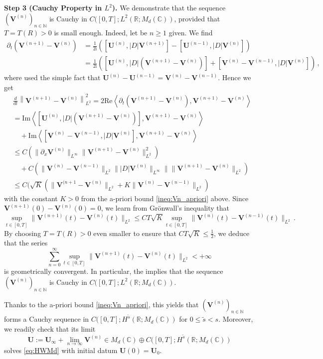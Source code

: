 \documentclass[11pt,reqno]{amsart}
\theoremstyle{definition}
\theoremstyle{remark}
\theoremstyle{remark}
\numberwithin{equation}{section}
\newcommand{\C}{\mathbb{C}}
\newcommand{\N}{\mathbb{N}}
\newcommand{\R}{\mathbb{R}}
\newcommand{\pt}{\partial}
\newcommand{\ii}{\mathrm{i}}
\newcommand{\Vb}{\mathbf{V}}
\newcommand{\Ub}{\mathbf{U}}
\begin{document}
\begin{appendix}
\medskip
\textbf{Step 3 (Cauchy Property in $L^2$).} We demonstrate that the sequence $(\Vb^{(n)})_{n \in \N}$ is Cauchy in $C([0,T]; L^2(\R; M_d(\C))$, provided that $T=T(R) > 0$ is small enough. Indeed, let be $n \geq 1$ given. We find
\begin{align*}
\pt_t \left ( \Vb^{(n+1)} - \Vb^{(n)} \right ) & = \frac{1}{2 \ii} \left ( [\Ub^{(n)}, |D| \Vb^{(n+1)}] - [\Ub^{(n-1)}, |D| \Vb^{(n)}] \right ) \\
& = \frac{1}{2 \ii} \left ( [\Ub^{(n)}, |D| (\Vb^{(n+1)}- \Vb^{(n)})] + [ \Vb^{(n)}-\Vb^{(n-1)}, |D| \Vb^{(n)}] \right ) \, ,
\end{align*}
where used the simple fact that $\Ub^{(n)}-\Ub^{(n-1)} = \Vb^{(n)}-\Vb^{(n-1)}$. Hence we get
\begin{align*}
& \frac{d}{dt} \left \| \Vb^{(n+1)}- \Vb^{(n)} \right \|_{L^2}^2  = 2 \mathrm{Re} \left \langle \pt_t(\Vb^{(n+1)}- \Vb^{(n)}), \Vb^{(n+1)}- \Vb^{(n)} \right  \rangle \\
&= \mathrm{Im} \left \langle [\Ub^{(n)}, |D| (\Vb^{(n+1)}-\Vb^{(n)})], \Vb^{(n+1)}-\Vb^{(n)} \right  \rangle \\
& \quad + \mathrm{Im} \left \langle [\Vb^{(n)}-\Vb^{(n-1)}, |D| \Vb^{(n)}], \Vb^{(n+1)}-\Vb^{(n)} \right \rangle \\
& \leq C ( \| \pt_x \Vb^{(n)} \|_{L^\infty} \| \Vb^{(n+1)}- \Vb^{(n)} \|_{L^2}^2 ) \\ 
& \quad + C (\| \Vb^{(n)}-\Vb^{(n-1)} \|_{L^2} \| |D| \Vb^{(n)} \|_{L^\infty} \| \| \Vb^{(n+1)}-\Vb^{(n)} \|_{L^2}) \\
& \leq C( \sqrt{K} ( \| \Vb^{(n+1} - \Vb^{(n)} \|_{L^2} + K \| \Vb^{(n)}-\Vb^{(n-1)}  \|_{L^2} )
\end{align*}
with the constant $K>0$ from the a-priori bound \eqref{ineq:Vn_apriori} above. Since $\Vb^{(n+1)}(0)-\Vb^{(n)}(0) =0$, we learn from Gr\"onwall's inequality that
$$ 
\sup_{t \in [0,T]} \| \Vb^{(n+1)}(t)- \Vb^{(n)}(t) \|_{L^2} \leq C T \sqrt{K}  \sup_{t \in [0,T]} \| \Vb^{(n)}(t) - \Vb^{(n-1)}(t) \|_{L^2} \, .
$$
By choosing $T = T(R) > 0$ even smaller to ensure that $CT \sqrt{K} \leq \frac{1}{2}$, we deduce that the series 
$$
\sum_{n=0}^\infty \sup_{t \in [0,T]} \| \Vb^{(n+1)}(t) - \Vb^{(n)}(t) \|_{L^2} < +\infty
$$ 
is geometrically convergent. In particular, the implies that the sequence $(\Vb^{(n)})_{n \in \N}$ is Cauchy in $C([0,T]; L^2(\R; M_d(\C))$.

Thanks to the a-priori bound \eqref{ineq:Vn_apriori}, this yields that $(\Vb^{(n)})_{n \in \N}$ forms a Cauchy sequence in $C([0,T]; H^{\tilde{s}}(\R; M_d(\C))$ for $0 \leq \tilde{s} <s$. Moreover, we readily check that its limit
$$
\Ub := \Ub_\infty + \lim_{n \to \infty} \Vb^{(n)} \in M_d(\C) \oplus C([0,T]; H^{\tilde{s}}(\R; M_d(\C))
$$
solves \eqref{eq:HWMd} with initial datum $\Ub(0)=\Ub_0$. 


\end{appendix}
\end{document}
